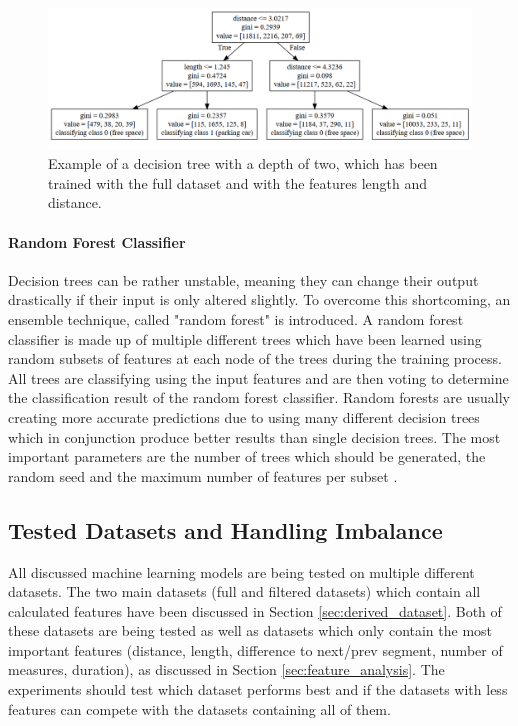 \begin{figure}
	\centering
	\includegraphics[width=\textwidth]{img/decision_tree2.PNG}

	\caption{Example of a decision tree with a depth of two, which has been trained with the full dataset and with the features length and distance.}
	\label{fig:decision_tree}
\end{figure}





\paragraph{Random Forest Classifier}

Decision trees can be rather unstable, meaning they can change their output drastically if their input is only altered slightly. To overcome this shortcoming, an ensemble technique, called "random forest" is introduced. A random forest classifier is made up of multiple different trees which have been learned using random subsets of features at each node of the trees during the training process. All trees are classifying using the input features and are then voting to determine the classification result of the random forest classifier. Random forests are usually creating more accurate predictions due to using many different decision trees which in conjunction produce better results than single decision trees. The most important parameters are the number of trees which should be generated, the random seed and the maximum number of features per subset \cite{Hall2016_DataMining_ML}.





\subsection{Tested Datasets and Handling Imbalance}
\label{sec:tested_datasets_and_handling_imbalance}

All discussed machine learning models are being tested on multiple different datasets. The two main datasets (full and filtered datasets) which contain all calculated features have been discussed in Section \ref{sec:derived_dataset}. Both of these datasets are being tested as well as datasets which only contain the most important features (distance, length, difference to next/prev segment, number of measures, duration), as discussed in Section \ref{sec:feature_analysis}. The experiments should test which dataset performs best and if the datasets with less features can compete with the datasets containing all of them.

